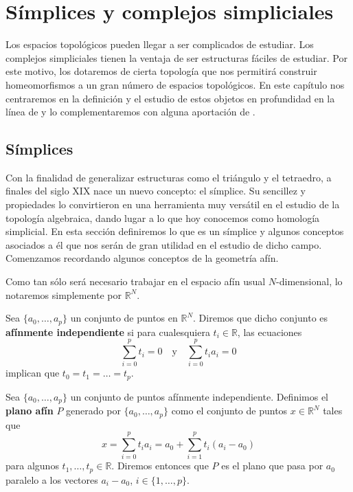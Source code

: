 
\chapter{Símplices y complejos simpliciales}

Los espacios topológicos pueden llegar a ser complicados de estudiar. Los
complejos simpliciales tienen la ventaja de ser estructuras fáciles de estudiar.
Por este motivo, los dotaremos de cierta topología que nos permitirá construir
homeomorfismos a un gran número de espacios topológicos. En este capítulo nos centraremos
en la definición y el estudio de estos objetos en profundidad en la línea de \cite{munkres2018elements}
y lo complementaremos con alguna aportación de \cite{lee2010introduction}.

\section{Símplices}
Con la finalidad de generalizar estructuras como el triángulo y el tetraedro, a
finales del siglo XIX nace un nuevo concepto: el símplice. Su sencillez y
propiedades lo convirtieron en una herramienta muy versátil en el estudio de la
topología algebraica, dando lugar a lo que hoy conocemos como homología simplicial.
En esta sección definiremos lo que es un símplice y algunos conceptos asociados
a él que nos serán de gran utilidad en el estudio de dicho campo. Comenzamos recordando
algunos conceptos de la geometría afín.

Como tan sólo será necesario trabajar en el espacio afín usual $N$-dimensional,
lo notaremos simplemente por $\mathbb{R}^{N}$.

\begin{definicion}
	Sea $\{a_{0}, \dots, a_{p}\}$ un conjunto de puntos en $\mathbb{R}^{N}$.
	Diremos que dicho conjunto es \textbf{afínmente independiente} si para cualesquiera
	$t_{i} \in \mathbb{R}$, las ecuaciones
	\[
	\sum_{i=0}^{p}t_{i}=0 \quad \text{y}\quad \sum_{i=0}^{p}t_{i}a_{i}=0
	\]
	implican que $t_{0} = t_{1} = \dots = t_{p}$.
\end{definicion}

\begin{definicion}
	Sea $\{a_{0}, \dots, a_{p}\}$ un conjunto de puntos afínmente independiente.
	Definimos el \textbf{plano afín} $P$ generado por $\{a_{0}, \dots, a_{p}\}$ como
	el conjunto de puntos $x \in \mathbb{R}^{N}$ tales que
	\[
	x = \sum_{i=0}^{p}t_{i}a_{i} = a_{0} + \sum_{i=1}^{p}t_{i}(a_{i} - a_{0})
	\]
	para algunos $t_{1}, \dots, t_{p} \in \mathbb{R}$. Diremos entonces que $P$ es
	el plano que pasa por $a_{0}$ paralelo a los vectores $a_{i} - a_{0}$, $i \in \{
	1, \dots, p\}$.
\end{definicion}

